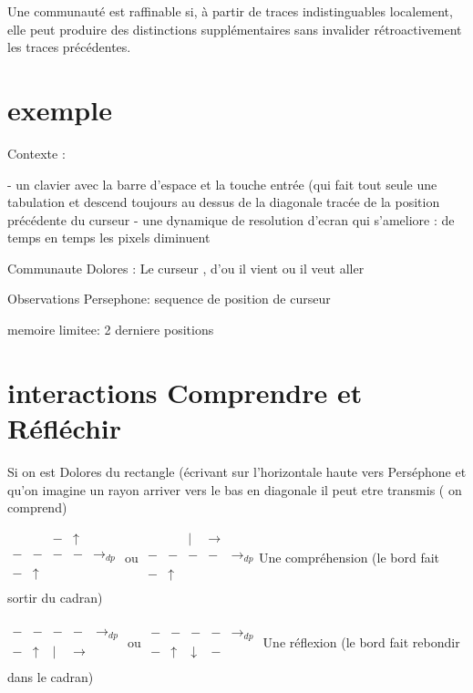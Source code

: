 \documentclass{article}
\begin{document}
Une communauté est raffinable si, à partir de traces indistinguables localement, elle peut produire des distinctions supplémentaires sans invalider rétroactivement les traces précédentes. 



\section{exemple}

Contexte : 

- un clavier avec la barre d'espace  et la touche entrée (qui fait tout seule une tabulation et descend toujours au dessus de la diagonale tracée de la position précédente du curseur
- une dynamique de resolution d'ecran qui s'ameliore : de temps en temps les pixels diminuent

Communaute Dolores : Le curseur , d'ou il vient ou il veut aller

Observations Persephone: sequence de position de curseur

 memoire limitee: 2 derniere positions
 
 \section{interactions Comprendre et Réfléchir}
 Si on est Dolores du rectangle  (écrivant sur l'horizontale haute vers Perséphone et qu'on imagine un rayon arriver vers le bas en diagonale  il peut etre transmis ( on comprend)
 
 $\begin{matrix}
 &&-&\uparrow\\
 -&-&-&-&\rightarrow_{dp}\\
 -&\uparrow&&\\
 \end{matrix} $  ou  $\begin{matrix}
 &&|&\rightarrow\\
 -&-&-&-&\rightarrow_{dp}\\
 -&\uparrow&&\\
 \end{matrix} $Une compréhension (le bord fait sortir du cadran)
 
 
 $\begin{matrix}
 &&&\\
 -&-&-&-&\rightarrow_{dp}\\
 -&\uparrow&|&\rightarrow\\
 \end{matrix} $
ou  $\begin{matrix}
 &&&\\
 -&-&-&-&\rightarrow_{dp}\\
 -&\uparrow&\downarrow&-\\
 \end{matrix} $    Une réflexion (le bord fait rebondir  dans le  cadran)
 
\end{document}
